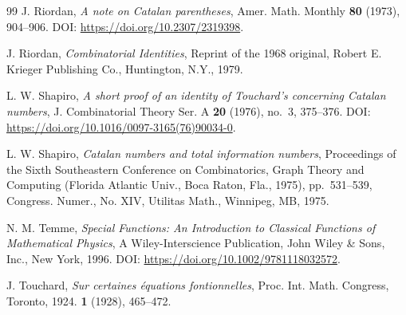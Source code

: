 \documentclass[reqno]{amsart}
\numberwithin{equation}{section}
\theoremstyle{plain}
\theoremstyle{remark}
\begin{document}
\begin{thebibliography}{99}
J. Riordan, \textit{A note on Catalan parentheses}, Amer. Math. Monthly \textbf{80} (1973), 904\nobreakdash--906. DOI: \url{https://doi.org/10.2307/2319398}.

J. Riordan, \emph{Combinatorial Identities}, Reprint of the 1968 original, Robert E. Krieger Publishing Co., Huntington, N.Y., 1979.

L. W. Shapiro, \textit{A short proof of an identity of Touchard's concerning Catalan numbers}, J. Combinatorial Theory Ser. A \textbf{20} (1976), no.~3, 375\nobreakdash--376. DOI: \url{https://doi.org/10.1016/0097-3165(76)90034-0}.

L. W. Shapiro, \textit{Catalan numbers and total information numbers}, Proceedings of the Sixth Southeastern Conference on Combinatorics, Graph Theory and Computing (Florida Atlantic Univ., Boca Raton, Fla., 1975), pp.~531\nobreakdash--539, Congress. Numer., No. XIV, Utilitas Math., Winnipeg, MB, 1975.

N. M. Temme, \emph{Special Functions: An Introduction to Classical Functions of Mathematical Physics}, A Wiley-Interscience Publication, John Wiley \& Sons, Inc., New York, 1996. DOI: \url{https://doi.org/10.1002/9781118032572}.

J. Touchard, \textit{Sur certaines \'equations fontionnelles}, Proc. Int. Math. Congress, Toronto, 1924. \textbf{1} (1928), 465\nobreakdash--472.

\end{thebibliography}
\end{document}
